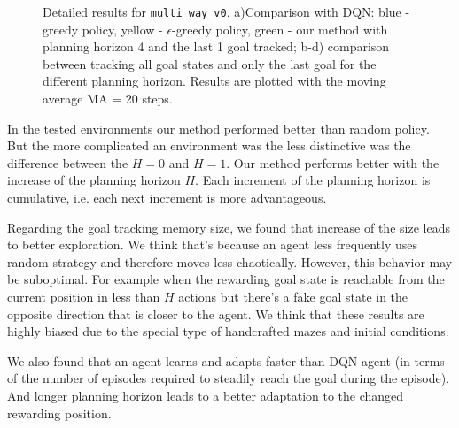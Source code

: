 \documentclass[a4paper,twoside]{article}
\begin{document}
\begin{figure}
  \centering
  \begin{minipage}{.49\linewidth}
    
  \end{minipage}
  \begin{minipage}{.49\linewidth}
    
  \end{minipage}
  
  \begin{minipage}{.49\linewidth}
    
  \end{minipage}
  \begin{minipage}{.49\linewidth}
    
  \end{minipage}

  \caption{Detailed results for \texttt{multi\_way\_v0}. a)Comparison with DQN: blue - greedy policy, yellow - $\epsilon$-greedy policy, green - our method with planning horizon 4 and the last 1 goal tracked; b-d) comparison between tracking all goal states and only the last goal for the different planning horizon. Results are plotted with the moving average MA = 20 steps.} \label{fig_detailed_mw0}
\end{figure}

In the tested environments our method performed better than random policy. But the more complicated an environment was the less distinctive was the difference between the $H = 0$ and $H = 1$. Our method performs better with the increase of the planning horizon $H$. Each increment of the planning horizon is cumulative, i.e. each next increment is more advantageous.

Regarding the goal tracking memory size, we found that increase of the size leads to better exploration. We think that's because an agent less frequently uses random strategy and therefore moves less chaotically. However, this behavior may be suboptimal. For example when the rewarding goal state is reachable from the current position in less than $H$ actions but there's a fake goal state in the opposite direction that is closer to the agent. We think that these results are highly biased due to the special type of handcrafted mazes and initial conditions.
  
We also found that an agent learns and adapts faster than DQN agent (in terms of the number of episodes required to steadily reach the goal during the episode). And longer planning horizon leads to a better adaptation to the changed rewarding position.
\end{document}
